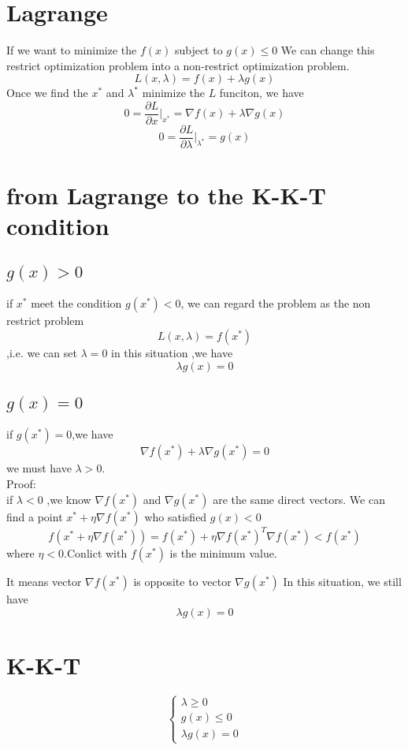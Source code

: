 \documentclass{article}
\begin{document}
\section{Lagrange}
If we want to minimize the $f(x)$ subject to $g(x) \leq 0$
We can change this restrict optimization problem into a non-restrict
 optimization problem.
\begin{equation}
L(x,\lambda) = f(x) + \lambda g(x)
\end{equation}
Once we find the $x^*$ and $\lambda^*$ minimize the $L$ funciton,
we have 
\begin{equation}
0 = \frac{\partial L}{\partial x }|_{x^*} = \nabla f(x) + \lambda \nabla g(x)
\end{equation}
\begin{equation}
0 = \frac{\partial L}{\partial \lambda }|_{\lambda^*}  = g(x)
\end{equation}
\section{from Lagrange to the K-K-T condition}
\subsection{$g(x) > 0$}
if $x^*$ meet the condition $g(x^*) < 0 $, we can regard the problem as the non restrict problem 
$$ L(x,\lambda)= f(x^*) $$ 
,i.e. we can set $ \lambda = 0$
in this situation ,we have 
\begin{equation}
\lambda g(x) = 0
\end{equation}

\subsection{$g(x) = 0$}
 if $g(x^*) = 0$,we have 
 \begin{equation}
 \nabla f(x^*) + \lambda \nabla g(x^*) = 0
 \end{equation}
 we must have $\lambda > 0 $.\\
 Proof:\\
 if $\lambda < 0 $ ,we know
 $\nabla f(x^*)$ and $\nabla g(x^*)$ are the same direct vectors.
 We can find a point $x^* + \eta \nabla f(x^*)$ who satisfied $g(x)< 0$
 \begin{equation}
 f(x^* + \eta \nabla f(x^*)) = f(x^*) + \eta \nabla f(x^*) ^T \nabla f(x^*) < f(x^*)
 \end{equation}
where $\eta < 0$.Conlict with $f(x^*)$ is the minimum value.
 
 It means vector $ \nabla f(x^*) $ is opposite to vector $ \nabla g(x^*) $
In this situation, we still have $$\lambda g(x) = 0$$
 \section{K-K-T}
 \begin{equation}
  \begin{cases}
 \lambda \geq 0 \\
  g(x) \leq 0 \\
   \lambda g(x) = 0
  \end{cases}
 \end{equation}
\end{document}
